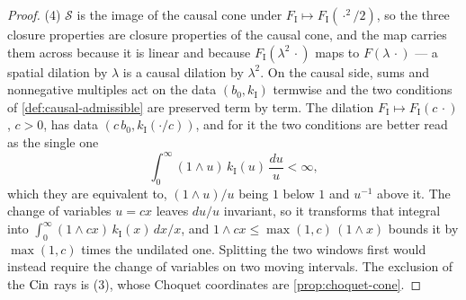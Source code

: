 \begin{proof}
(4) $\mathcal{S}$ is the image of the causal cone under $F_{\mathrm I} \mapsto
F_{\mathrm I}(\cdot^2/2)$, so the three closure properties are closure properties of the causal
cone, and the map carries them across because it is linear and because
$F_{\mathrm I}(\lambda^2\,\cdot)$ maps to $F(\lambda\,\cdot)$ --- a spatial dilation by
$\lambda$ is a causal dilation by $\lambda^2$. On the causal side, sums and nonnegative
multiples act on the data $(b_0, k_{\mathrm I})$ termwise and the two conditions of
\ref{def:causal-admissible} are preserved term by term. The dilation $F_{\mathrm I} \mapsto
F_{\mathrm I}(c\,\cdot)$, $c > 0$, has data $(c\,b_0, k_{\mathrm I}(\cdot/c))$, and for it the
two conditions are better read as the single one
\[
  \int_0^\infty (1 \wedge u)\,k_{\mathrm I}(u)\,\frac{du}{u} < \infty,
\]
which they are equivalent to, $(1 \wedge u)/u$ being $1$ below $1$ and $u^{-1}$ above it. The
change of variables $u = cx$ leaves $du/u$ invariant, so it transforms that integral into
$\int_0^\infty (1 \wedge cx)\,k_{\mathrm I}(x)\,dx/x$, and
$1 \wedge cx \le \max(1,c)\,(1 \wedge x)$ bounds it by $\max(1,c)$ times the undilated one. Splitting the two windows first would
instead require the change of variables on two moving intervals. The exclusion of the $\operatorname{Cin}$
rays is (3), whose Choquet coordinates are \ref{prop:choquet-cone}.
\end{proof}

